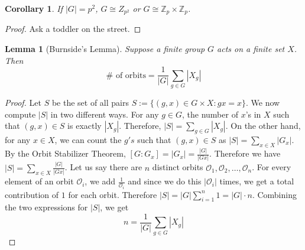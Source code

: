 \documentclass{article}
\newcommand{\Z}{\mathbb{Z}}
\newtheorem{lemma}[theorem]{Lemma}
\newtheorem{corollary}[theorem]{Corollary}
\theoremstyle{definition}
\begin{document}
\begin{corollary}
    If $|G|=p^2 $, $G\cong Z_{p^2}$ or $G\cong \Z_p \times \Z_p$.
\end{corollary}
\begin{proof}
    Ask a toddler on the street.
\end{proof}
\begin{lemma}[Burnside's Lemma]
    Suppose a finite group $G$ acts on a finite set $X$. Then 
    \begin{equation*}
        \# \text{ of orbits} = \frac{1}{|G|}\sum_{g\in G} |X_g|
    \end{equation*}
\end{lemma}
\begin{proof}
    Let $S$ be the set of all pairs $S := \{(g,x) \in G \times X : gx = x\}$. We now compute $|S|$ in two different ways. For any $g\in G$, the number of $x$'s in $X$ such that $(g,x) \in S$ is exactly $|X_g|$. Therefore, $|S| = \sum_{g\in G} |X_g|$. On the other hand, for any $x\in X$, we can count the $g's$ such that $(g,x) \in S$ as $|S| = \sum_{x\in X} |G_x|$. By the Orbit Stabilizer Theorem, $[G:G_x] = |G_x| = \frac{|G|}{|Gx|}$. Therefore we have $|S| = \sum_{x\in X} \frac{|G|}{|Gx|}$. Let us say there are $n$ distinct orbits $\mathcal{O}_1, \mathcal{O}_2, \ldots, \mathcal{O}_n$. For every element of an orbit $\mathcal{O}_i$, we add $\frac{1}{\mathcal{O}_i}$ and since we do this $|\mathcal{O}_i|$ times, we get a total contribution of $1$ for each orbit. Therefore $|S| = |G| \sum^n_{i=1} 1 = |G| \cdot n$. Combining the two expressions for $|S|$, we get 
    \begin{equation*}
        n = \frac{1}{|G|} \sum_{g\in G} |X_g|
    \end{equation*}
\end{proof}
\end{document}
